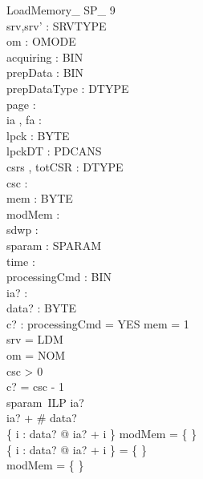 \begin{schema}{LoadMemory\_ SP\_ 9}\\
 srv,srv' : SRVTYPE \\
 om : OMODE \\
 acquiring : BIN \\
 prepData : BIN \\
 prepDataType : DTYPE \\
 page : \nat \\
 ia , fa : \nat \\
 lpck : \seq BYTE \\
 lpckDT : PDCANS \\
 csrs , totCSR : DTYPE \fun \nat \\
 csc : \nat \\
 mem : \nat \pfun BYTE \\
 modMem : \power \nat \\
 sdwp : \nat \\
 sparam : SPARAM \fun \nat \\
 time : \nat \\
 processingCmd : BIN \\
 ia? : \nat \\
 data? : \seq BYTE \\
 c? : \nat 
\where
 processingCmd = YES \land \dom mem = 1  \\
 srv = LDM \\
 om = NOM \\
 csc > 0 \\
 c? = csc - 1 \\
 sparam~ILP \leq ia? \\
 ia? + \# data?   \\
 \{ i : \dom data? @ ia? + i \} \cap modMem = \{ \} \\
 \{ i : \dom data? @ ia? + i \} = \{ \} \\
 modMem = \{ \}
\end{schema}


